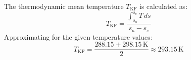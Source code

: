 The thermodynamic mean temperature \( T_{\text{KF}} \) is calculated as:  
\[
T_{\text{KF}} = \frac{\int_{s_a}^{s_e} T \, ds}{s_a - s_e}
\]  
Approximating for the given temperature values:  
\[
T_{\text{KF}} = \frac{288.15 + 298.15 \, \text{K}}{2} \approx 293.15 \, \text{K}
\]